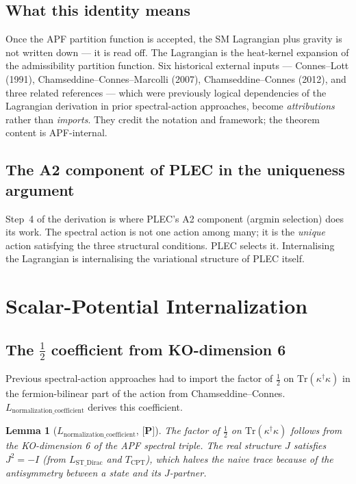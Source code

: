 \documentclass[11pt]{article}
\newcommand{\epitag}[1]{\textbf{[#1]}}
\newtheorem{lemma}[theorem]{Lemma}
\theoremstyle{definition}
\begin{document}
\subsection{What this identity means}
Once the APF partition function is accepted, the SM Lagrangian plus gravity is not written down --- it is read off.  The Lagrangian is the heat-kernel expansion of the admissibility partition function.  Six historical external inputs --- Connes--Lott (1991), Chamseddine--Connes--Marcolli (2007), Chamseddine--Connes (2012), and three related references --- which were previously logical dependencies of the Lagrangian derivation in prior spectral-action approaches, become \emph{attributions} rather than \emph{imports}.  They credit the notation and framework; the theorem content is APF-internal.

\subsection{The A2 component of PLEC in the uniqueness argument}
Step~4 of the derivation is where PLEC's A2 component (argmin selection) does its work.  The spectral action is not one action among many; it is the \emph{unique} action satisfying the three structural conditions.  PLEC selects it.  Internalising the Lagrangian is internalising the variational structure of PLEC itself.

\section{Scalar-Potential Internalization}\label{sec:scalarpot}

\subsection{The $\tfrac{1}{2}$ coefficient from KO-dimension 6}
Previous spectral-action approaches had to import the factor of $\tfrac{1}{2}$ on $\mathrm{Tr}(\kappa^\dagger \kappa)$ in the fermion-bilinear part of the action from Chamseddine--Connes.  $L_{\mathrm{normalization\_coefficient}}$ derives this coefficient.

\begin{lemma}[$L_{\mathrm{normalization\_coefficient}}$, $\epitag{P}$]
The factor of $\tfrac{1}{2}$ on $\mathrm{Tr}(\kappa^\dagger \kappa)$ follows from the KO-dimension 6 of the APF spectral triple.  The real structure $J$ satisfies $J^2 = -I$ (from $L_{\mathrm{ST\_Dirac}}$ and $T_{\mathrm{CPT}}$), which halves the naive trace because of the antisymmetry between a state and its $J$-partner.
\end{lemma}
\end{document}
